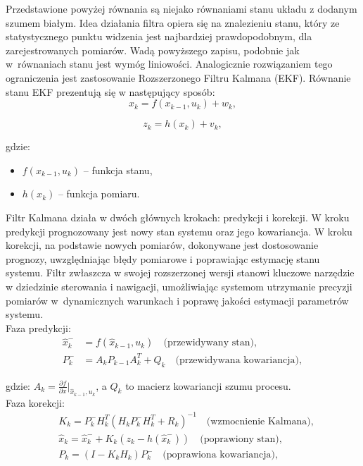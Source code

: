Przedstawione powyżej równania są niejako równaniami stanu układu z dodanym szumem białym. Idea działania filtra opiera się na znalezieniu stanu, który ze statystycznego punktu widzenia jest najbardziej prawdopodobnym, dla zarejestrowanych pomiarów. Wadą powyższego zapisu, podobnie jak w~równaniach stanu jest wymóg liniowości. Analogicznie rozwiązaniem tego ograniczenia jest zastosowanie Rozszerzonego Filtru Kalmana (EKF). Równanie stanu EKF prezentują się w następujący sposób:
\[
  x_k =  f \left( x_{k-1},  u_k \right) + w_k,
\]

\[
  z_k = h \left(x_k \right) + v_k,
\]

gdzie:
\begin{itemize}
  \item $ f \left( x_{k-1},  u_k \right)$ -- funkcja stanu, 
  \item $h \left(x_k \right)$ -- funkcja pomiaru.
\end{itemize}

Filtr Kalmana działa w dwóch głównych krokach: predykcji i korekcji. W kroku predykcji prognozowany jest nowy stan systemu oraz jego kowariancja. W kroku korekcji, na podstawie nowych pomiarów, dokonywane jest dostosowanie prognozy, uwzględniając błędy pomiarowe i poprawiając estymację stanu systemu. Filtr zwłaszcza w swojej rozszerzonej wersji stanowi kluczowe narzędzie w dziedzinie sterowania i nawigacji, umożliwiając systemom utrzymanie precyzji pomiarów w~dynamicznych warunkach i poprawę jakości estymacji parametrów systemu.\\

Faza predykcji:
\[
\begin{aligned}
  \hat{x}_k^- & = f(\hat{x}_{k-1}, u_k) \quad \text{(przewidywany stan)}, \\
  P_k^- & = A_k P_{k-1} A_k^T + Q_k \quad \text{(przewidywana kowariancja)},
\end{aligned}
\]

gdzie: $A_k = \frac{\partial f}{\partial x}\Bigr|_{\hat{x}_{k-1}, u_k}$, a $Q_k$ to macierz kowariancji szumu procesu.\\

Faza korekcji:
\[
\begin{aligned}
  &K_k = P_k^- H_k^T (H_k P_k^- H_k^T + R_k)^{-1} \quad \text{(wzmocnienie Kalmana)}, \\
  &\hat{x}_k = \hat{x}_k^- + K_k(z_k - h(\hat{x}_k^-)) \quad \text{(poprawiony stan)}, \\
  &P_k = (I - K_k H_k) P_k^- \quad \text{(poprawiona kowariancja)},
\end{aligned}
\]

